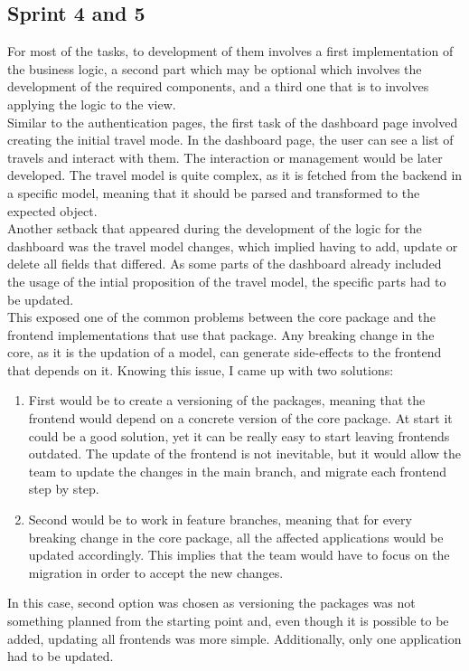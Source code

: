 \documentclass[../memory.tex]{subfiles}
\begin{document}
\subsection{Sprint 4 and 5}
For most of the tasks, to development of them involves a first implementation of
the business logic, a second part which may be optional which involves the
development of the required components, and a third one that is to involves
applying the logic to the view.
\\[8pt]
Similar to the authentication pages, the first task of the dashboard page
involved creating the initial travel mode. In the dashboard page, the user can
see a list of travels and interact with them. The interaction or management
would be later developed. The travel model is quite complex, as it is
fetched from the backend in a specific model, meaning that it should be parsed
and transformed to the expected object.
\\
Another setback that appeared during the development of the logic for the
dashboard was the travel model changes, which implied having to add, update or
delete all fields that differed. As some parts of the dashboard already included
the usage of the intial proposition of the travel model, the specific parts had
to be updated.
\\
This exposed one of the common problems between the core package and the
frontend implementations that use that package. Any breaking change in the core,
as it is the updation of a model, can generate side-effects to the frontend that
depends on it. Knowing this issue, I came up with two solutions:
\begin{enumerate}
	\item First would be to create a versioning of the packages, meaning that the
	      frontend would depend on a concrete version of the core package. At start it
	      could be a good solution, yet it can be really easy to start leaving
	      frontends outdated. The update of the frontend is not inevitable, but it
	      would allow the team to update the changes in the main branch, and migrate
	      each frontend step by step.
	\item Second would be to work in feature branches, meaning that for every
	      breaking change in the core package, all the affected applications would be
	      updated accordingly. This implies that the team would have to focus on the
	      migration in order to accept the new changes.
\end{enumerate}
In this case, second option was chosen as versioning the packages was not
something planned from the starting point and, even though it is possible to be
added, updating all frontends was more simple. Additionally, only one
application had to be updated.
\end{document}
